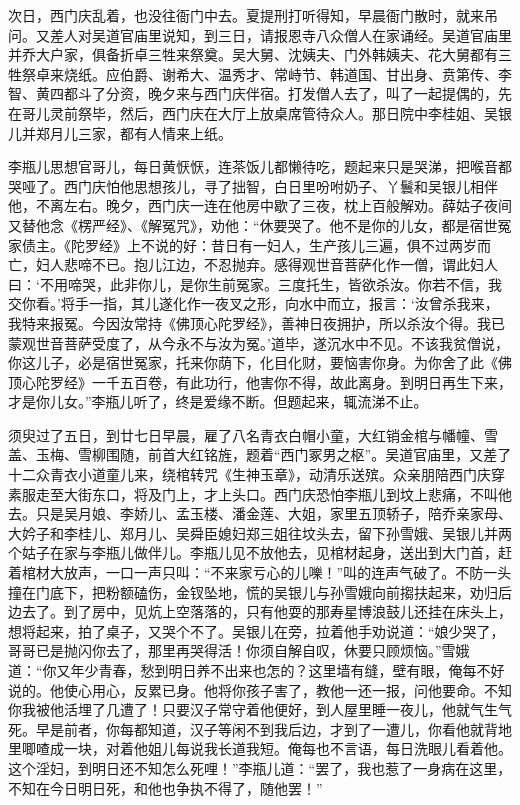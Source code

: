 次日，西门庆乱着，也没往衙门中去。夏提刑打听得知，早晨衙门散时，就来吊问。又差人对吴道官庙里说知，到三日，请报恩寺八众僧人在家诵经。吴道官庙里并乔大户家，俱备折卓三牲来祭奠。吴大舅、沈姨夫、门外韩姨夫、花大舅都有三牲祭卓来烧纸。应伯爵、谢希大、温秀才、常峙节、韩道国、甘出身、贲第传、李智、黄四都斗了分资，晚夕来与西门庆伴宿。打发僧人去了，叫了一起提偶的，先在哥儿灵前祭毕，然后，西门庆在大厅上放桌席管待众人。那日院中李桂姐、吴银儿并郑月儿三家，都有人情来上纸。

李瓶儿思想官哥儿，每日黄恹恹，连茶饭儿都懒待吃，题起来只是哭涕，把喉音都哭哑了。西门庆怕他思想孩儿，寻了拙智，白日里吩咐奶子、丫鬟和吴银儿相伴他，不离左右。晚夕，西门庆一连在他房中歇了三夜，枕上百般解劝。薛姑子夜间又替他念《楞严经》、《解冤咒》，劝他：“休要哭了。他不是你的儿女，都是宿世冤家债主。《陀罗经》上不说的好：昔日有一妇人，生产孩儿三遍，俱不过两岁而亡，妇人悲啼不已。抱儿江边，不忍抛弃。感得观世音菩萨化作一僧，谓此妇人曰：‘不用啼哭，此非你儿，是你生前冤家。三度托生，皆欲杀汝。你若不信，我交你看。’将手一指，其儿遂化作一夜叉之形，向水中而立，报言：‘汝曾杀我来，我特来报冤。今因汝常持《佛顶心陀罗经》，善神日夜拥护，所以杀汝个得。我已蒙观世音菩萨受度了，从今永不与汝为冤。’道毕，遂沉水中不见。不该我贫僧说，你这儿子，必是宿世冤家，托来你荫下，化目化财，要恼害你身。为你舍了此《佛顶心陀罗经》一千五百卷，有此功行，他害你不得，故此离身。到明日再生下来，才是你儿女。”李瓶儿听了，终是爱缘不断。但题起来，辄流涕不止。

须臾过了五日，到廿七日早晨，雇了八名青衣白帽小童，大红销金棺与幡幢、雪盖、玉梅、雪柳围随，前首大红铭旌，题着“西门冢男之枢”。吴道官庙里，又差了十二众青衣小道童儿来，绕棺转咒《生神玉章》，动清乐送殡。众亲朋陪西门庆穿素服走至大街东口，将及门上，才上头口。西门庆恐怕李瓶儿到坟上悲痛，不叫他去。只是吴月娘、李娇儿、孟玉楼、潘金莲、大姐，家里五顶轿子，陪乔亲家母、大妗子和李桂儿、郑月儿、吴舜臣媳妇郑三姐往坟头去，留下孙雪娥、吴银儿并两个姑子在家与李瓶儿做伴儿。李瓶儿见不放他去，见棺材起身，送出到大门首，赶着棺材大放声，一口一声只叫：“不来家亏心的儿嚛！”叫的连声气破了。不防一头撞在门底下，把粉额磕伤，金钗坠地，慌的吴银儿与孙雪娥向前搊扶起来，劝归后边去了。到了房中，见炕上空落落的，只有他耍的那寿星博浪鼓儿还挂在床头上，想将起来，拍了桌子，又哭个不了。吴银儿在旁，拉着他手劝说道：“娘少哭了，哥哥已是抛闪你去了，那里再哭得活！你须自解自叹，休要只顾烦恼。”雪娥道：“你又年少青春，愁到明日养不出来也怎的？这里墙有缝，壁有眼，俺每不好说的。他使心用心，反累已身。他将你孩子害了，教他一还一报，问他要命。不知你我被他活埋了几遭了！只要汉子常守着他便好，到人屋里睡一夜儿，他就气生气死。早是前者，你每都知道，汉子等闲不到我后边，才到了一遭儿，你看他就背地里唧喳成一块，对着他姐儿每说我长道我短。俺每也不言语，每日洗眼儿看着他。这个淫妇，到明日还不知怎么死哩！”李瓶儿道：“罢了，我也惹了一身病在这里，不知在今日明日死，和他也争执不得了，随他罢！”

